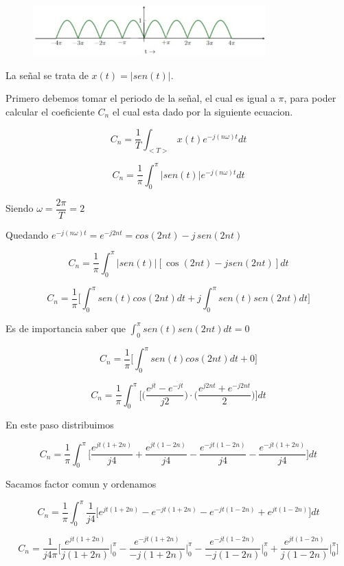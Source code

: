 \begin{figure}[H]
  \centering
  \includegraphics[width=0.8\textwidth]{photos/onda_completa.png}
\end{figure}

La se\~nal se trata de $x(t) = |sen(t)|$.

Primero debemos tomar el periodo de la se\~nal, el cual es igual a $\pi$, para poder calcular el coeficiente $C_n$ el cual esta dado por la siguiente ecuacion.

$$C_n = \dfrac{1}{T} \int_{<T>} x(t) e^{-j(n\omega)t} dt$$

$$C_n = \dfrac{1}{\pi} \int_{0}^{\pi} |sen(t)| e^{-j(n\omega)t} dt$$

Siendo $\omega = \dfrac{2\pi}{T} = 2$

Quedando $e^{-j(n\omega)t} = e^{-j2nt} = cos(2nt)-j\,sen(2nt)$

$$C_n = \dfrac{1}{\pi} \int_{0}^{\pi} |sen(t)| [\cos(2nt) - j sen(2nt)] dt$$

$$C_n = \dfrac{1}{\pi} \bigg[\int_{0}^{\pi} sen(t) cos(2nt) dt + j \int_{0}^{\pi} sen(t) sen(2nt) dt \bigg] $$

Es de importancia saber que $ \int_{0}^{\pi} sen(t) sen(2nt) dt = 0$

$$C_n = \dfrac{1}{\pi} \bigg[\int_{0}^{\pi} sen(t) cos(2nt) dt + 0 \bigg] $$

$$C_n = \dfrac{1}{\pi} \int_{0}^{\pi} \bigg[ \bigg(\dfrac{e^{jt}-e^{-jt}}{j2}\bigg) \cdot \bigg(\dfrac{e^{j2nt}+e^{-j2nt}}{2} \bigg) \bigg] dt $$

En este paso distribuimos

$$C_n = \dfrac{1}{\pi} \int_{0}^{\pi} \bigg[\dfrac{e^{jt(1+2n)}}{j4} + \dfrac{e^{jt(1-2n)}}{j4} - \dfrac{e^{-jt(1-2n)}}{j4} - \dfrac{e^{-jt(1+2n)}}{j4}\bigg] dt $$

Sacamos factor comun y ordenamos

$$C_n = \dfrac{1}{\pi} \int_{0}^{\pi} \dfrac{1}{j4} \bigg[e^{jt(1+2n)} - e^{-jt(1+2n)} - e^{-jt(1-2n)} + e^{jt(1-2n)}\bigg] dt $$

$$C_n = \dfrac{1}{j4\pi} \bigg[\dfrac{e^{jt(1+2n)}}{j(1+2n)} \bigg\rvert_{0}^{\pi} - \dfrac{e^{-jt(1+2n)}}{-j(1+2n)} \bigg\rvert_{0}^{\pi} - \dfrac{e^{-jt(1-2n)}}{-j(1-2n)} \bigg\rvert_{0}^{\pi} + \dfrac{e^{jt(1-2n)}}{j(1-2n)} \bigg\rvert_{0}^{\pi} \bigg] $$

